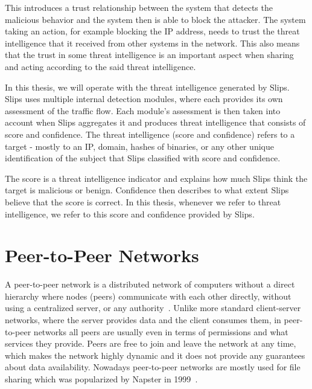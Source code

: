 This introduces a trust relationship between the system that detects the malicious behavior and the system then is able to block the attacker.
The system taking an action, for example blocking the IP address, needs to trust the threat intelligence that it received from other systems in the network.
This also means that the trust in some threat intelligence is an important aspect when sharing and acting according to the said threat intelligence.

In this thesis, we will operate with the threat intelligence generated by Slips.
Slips uses multiple internal detection modules, where each provides its own assessment of the traffic flow. 
Each module's assessment is then taken into account when Slips aggregates it and produces threat intelligence that consists of score and confidence.
The threat intelligence (score and confidence) refers to a target - mostly to an IP, domain, hashes of binaries, or any other unique identification of the subject that Slips classified with score and confidence.

The score is a threat intelligence indicator and explains how much Slips think the target is malicious or benign.
Confidence then describes to what extent Slips believe that the score is correct.
In this thesis, whenever we refer to threat intelligence, we refer to this score and confidence provided by Slips.

\section{Peer-to-Peer Networks}
\label{sec:peer-to-peer-networks}
A peer-to-peer network is a distributed network of computers without a direct hierarchy where nodes (peers) communicate with each other directly, without using a centralized server, or any authority~\cite{schollmeier}.
Unlike more standard client-server networks, where the server provides data and the client consumes them, in peer-to-peer networks all peers are usually even in terms of permissions and what services they provide.
Peers are free to join and leave the network at any time, which makes the network highly dynamic and it does not provide any guarantees about data availability.
Nowadays peer-to-peer networks are mostly used for file sharing which was popularized by Napster in 1999~\cite{saroiu}.